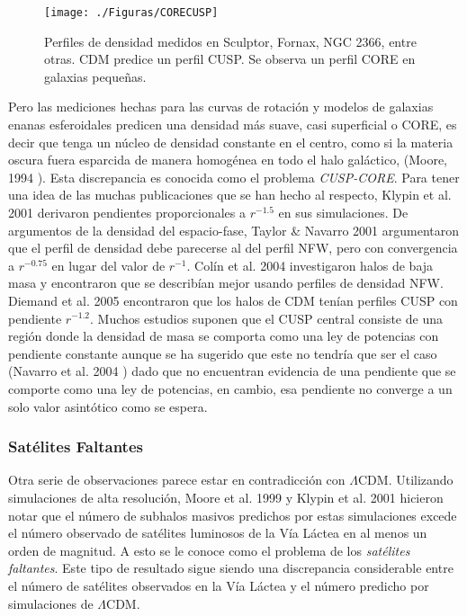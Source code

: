 \documentclass[a4paper,openright,10pt, oneside, final]{book}
\begin{document}
\begin{figure}
\centering
  \texttt{[image: ./Figuras/CORECUSP]}
  \caption{\footnotesize{Perfiles de densidad medidos en Sculptor, Fornax, NGC 2366, entre otras. CDM predice un perfil CUSP. Se observa un perfil CORE en galaxias pequeñas.}}
  \label{fig 1.10}
\end{figure}
  
Pero las mediciones hechas para las curvas de rotación y modelos de galaxias enanas esferoidales predicen una densidad más suave, casi superficial o CORE, es decir que tenga un núcleo de densidad constante en el centro, como si la materia oscura fuera esparcida de manera homogénea en todo el halo galáctico, (Moore, 1994 \cite{b2}). Esta discrepancia es conocida como el problema \textit{CUSP-CORE}.  Para tener una idea de las muchas publicaciones que se han hecho al respecto, Klypin et al. 2001 \cite{1.2.4} derivaron pendientes proporcionales a $r^{-1.5}$ en sus simulaciones. De argumentos de la densidad del espacio-fase, Taylor \& Navarro 2001 \cite{b26} argumentaron que el perfil de densidad debe parecerse al del perfil NFW, pero con convergencia a $r^{-0.75}$ en lugar del valor de $r^{-1}$. Colín et al. 2004 \cite{b27} investigaron halos de baja masa y encontraron que se describían mejor usando perfiles de densidad NFW. Diemand et al. 2005 \cite{b28} encontraron que los halos de CDM tenían perfiles CUSP con pendiente $r^{-1.2}$. 
Muchos estudios suponen que el CUSP central consiste de una región donde la densidad de masa se comporta como una ley de potencias con pendiente constante aunque se ha sugerido que este no tendría que ser el caso (Navarro et al. 2004 \cite{Navarro Hayashi}) dado que no encuentran evidencia de una pendiente que se comporte como una ley de potencias, en cambio, esa pendiente no converge a un solo valor asintótico como se espera.



\subsubsection*{Satélites Faltantes}
Otra serie de observaciones parece estar en contradicción con $\Lambda$CDM. Utilizando simulaciones de alta resolución, Moore et al. 1999 \cite{Moore 1999} y Klypin et al. 2001 \cite{1.2.4} hicieron notar que el número de subhalos masivos predichos por estas simulaciones excede el número observado de satélites luminosos de la Vía Láctea en al menos un orden de magnitud. A esto se le conoce como el problema de los \textit{satélites faltantes}. Este tipo de resultado sigue siendo una discrepancia considerable entre el número de satélites observados en la Vía Láctea y el número predicho por simulaciones de $\Lambda$CDM.
\end{document}
